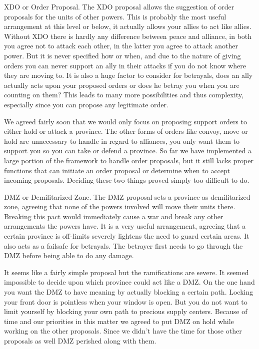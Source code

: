 \documentclass[a4paper]{article} %
\begin{document}
XDO or Order Proposal. The XDO proposal allows the suggestion of order proposals for the units of other powers.  This is probably the most useful arrangement at this level or below, it actually allows your allies to act like allies. Without XDO there is hardly any difference between peace and alliance, in both you agree not to attack each other, in the latter you agree to attack another power. But it is never specified how or when, and due to the nature of giving orders you can never support an ally in their attacks if you do not know where they are moving to. It is also a huge factor to consider for betrayals, does an ally actually acts upon your proposed orders or does he betray you when you are counting on them? This leads to many more possibilities and thus complexity, especially since you can propose any legitimate order.

We agreed fairly soon that we would only focus on proposing support orders to either hold or attack a province. The other forms of orders like convoy, move or hold are unnecessary to handle in regard to alliances, you only want them to support you so you can take or defend a province. So far we have implemented a large portion of the framework to handle order proposals, but it still lacks proper functions that can initiate an order proposal or determine when to accept incoming proposals. Deciding these two things proved simply too difficult to do.  

DMZ or Demilitarized Zone. The DMZ proposal sets a province as demilitarized zone, agreeing that none of the powers involved will move their units there. Breaking this pact would immediately cause a war and break any other arrangements the powers have. It is a very useful arrangement, agreeing that a certain province is off-limits severely lightens the need to guard certain areas. It also acts as a failsafe for betrayals. The betrayer first needs to go through the DMZ before being able to do any damage.

It seems like a fairly simple proposal but the ramifications are severe. It seemed impossible to decide upon which province could act like a DMZ. On the one hand you want the DMZ to have meaning by actually blocking a certain path. Locking your front door is pointless when your window is open. But you do not want to limit yourself by blocking your own path to precious supply centers. Because of time and our priorities in this matter we agreed to put DMZ on hold while working on the other proposals. Since we didn’t have the time for those other proposals as well DMZ perished along with them. 
\end{document}
